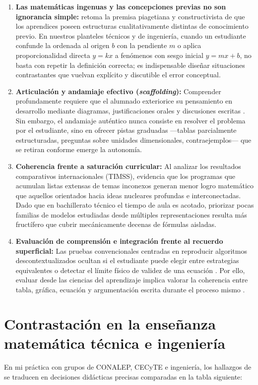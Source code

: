 \documentclass[spanish,letterpaper,oneside]{article}
\begin{document}
\begin{enumerate}
  \item \textbf{Las matemáticas ingenuas y las concepciones previas no son ignorancia simple:} \citet{sawyer2008optimizing} retoma la premisa piagetiana y constructivista de que los aprendices poseen estructuras cualitativamente distintas de conocimiento previo. En nuestros planteles técnicos y de ingeniería, cuando un estudiante confunde la ordenada al origen $b$ con la pendiente $m$ o aplica proporcionalidad directa $y=kx$ a fenómenos con sesgo inicial $y=mx+b$, no basta con repetir la definición correcta; es indispensable diseñar situaciones contrastantes que vuelvan explícito y discutible el error conceptual.
  \item \textbf{Articulación y andamiaje efectivo (\textit{scaffolding}):} Comprender profundamente requiere que el alumnado exteriorice su pensamiento en desarrollo mediante diagramas, justificaciones orales y discusiones escritas \citep{sawyer2008optimizing}. Sin embargo, el andamiaje auténtico nunca consiste en resolver el problema por el estudiante, sino en ofrecer pistas graduadas —tablas parcialmente estructuradas, preguntas sobre unidades dimensionales, contraejemplos— que se retiran conforme emerge la autonomía.
  \item \textbf{Coherencia frente a saturación curricular:} Al analizar los resultados comparativos internacionales (TIMSS), \citet{sawyer2008optimizing} evidencia que los programas que acumulan listas extensas de temas inconexos generan menor logro matemático que aquellos orientados hacia ideas nucleares profundas e interconectadas. Dado que en bachillerato técnico el tiempo de aula es acotado, priorizar pocas familias de modelos estudiadas desde múltiples representaciones resulta más fructífero que cubrir mecánicamente decenas de fórmulas aisladas.
  \item \textbf{Evaluación de comprensión e integración frente al recuerdo superficial:} Las pruebas convencionales centradas en reproducir algoritmos descontextualizados ocultan si el estudiante puede elegir entre estrategias equivalentes o detectar el límite físico de validez de una ecuación \citep{sawyer2008optimizing,star2015algebra}. Por ello, evaluar desde las ciencias del aprendizaje implica valorar la coherencia entre tabla, gráfica, ecuación y argumentación escrita durante el proceso mismo \citep{eef2021feedback}.
\end{enumerate}

\section{Contrastación en la enseñanza matemática técnica e ingeniería}
En mi práctica con grupos de CONALEP, CECyTE e ingeniería, los hallazgos de \citet{sawyer2008optimizing} se traducen en decisiones didácticas precisas comparadas en la tabla siguiente:
\end{document}
